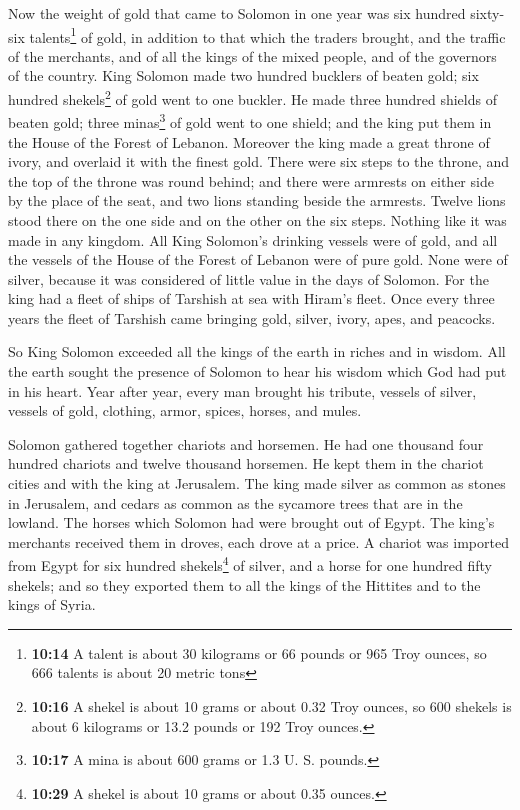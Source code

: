  Now the weight of gold that came to Solomon in one year
was six hundred sixty-six talents\footnote{\textbf{10:14} A talent is
  about 30 kilograms or 66 pounds or 965 Troy ounces, so 666 talents is
  about 20 metric tons} of gold,  in addition to that
which the traders brought, and the traffic of the merchants, and of all
the kings of the mixed people, and of the governors of the country.
 King Solomon made two hundred bucklers of beaten gold;
six hundred shekels\footnote{\textbf{10:16} A shekel is about 10 grams
  or about 0.32 Troy ounces, so 600 shekels is about 6 kilograms or 13.2
  pounds or 192 Troy ounces.} of gold went to one buckler.
 He made three hundred shields of beaten gold; three
minas\footnote{\textbf{10:17} A mina is about 600 grams or 1.3 U. S.
  pounds.} of gold went to one shield; and the king put them in the
House of the Forest of Lebanon.  Moreover the king made a
great throne of ivory, and overlaid it with the finest gold.
 There were six steps to the throne, and the top of the
throne was round behind; and there were armrests on either side by the
place of the seat, and two lions standing beside the armrests.
 Twelve lions stood there on the one side and on the
other on the six steps. Nothing like it was made in any kingdom.
 All King Solomon's drinking vessels were of gold, and
all the vessels of the House of the Forest of Lebanon were of pure gold.
None were of silver, because it was considered of little value in the
days of Solomon.  For the king had a fleet of ships of
Tarshish at sea with Hiram's fleet. Once every three years the fleet of
Tarshish came bringing gold, silver, ivory, apes, and peacocks.

 So King Solomon exceeded all the kings of the earth in
riches and in wisdom.  All the earth sought the presence
of Solomon to hear his wisdom which God had put in his heart.
 Year after year, every man brought his tribute, vessels
of silver, vessels of gold, clothing, armor, spices, horses, and mules.

 Solomon gathered together chariots and horsemen. He had
one thousand four hundred chariots and twelve thousand horsemen. He kept
them in the chariot cities and with the king at Jerusalem.
 The king made silver as common as stones in Jerusalem,
and cedars as common as the sycamore trees that are in the lowland.
 The horses which Solomon had were brought out of Egypt.
The king's merchants received them in droves, each drove at a price.
 A chariot was imported from Egypt for six hundred
shekels\footnote{\textbf{10:29} A shekel is about 10 grams or about 0.35
  ounces.} of silver, and a horse for one hundred fifty shekels; and so
they exported them to all the kings of the Hittites and to the kings of
Syria.

